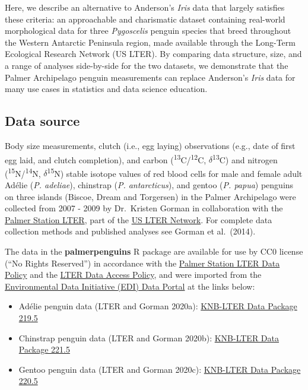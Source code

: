 Here, we describe an alternative to Anderson's \emph{Iris} data that largely satisfies these criteria: an approachable and charismatic dataset containing real-world morphological data for three \emph{Pygoscelis} penguin species that breed throughout the Western Antarctic Peninsula region, made available through the Long-Term Ecological Research Network (US LTER). By comparing data structure, size, and a range of analyses side-by-side for the two datasets, we demonstrate that the Palmer Archipelago penguin measurements can replace Anderson's \emph{Iris} data for many use cases in statistics and data science education.

\hypertarget{data-source}{%
\subsection{Data source}\label{data-source}}

Body size measurements, clutch (i.e., egg laying) observations (e.g., date of first egg laid, and clutch completion), and carbon (\textsuperscript{13}C/\textsuperscript{12}C, \(\delta\)\textsuperscript{13}C) and nitrogen (\textsuperscript{15}N/\textsuperscript{14}N, \(\delta\)\textsuperscript{15}N) stable isotope values of red blood cells for male and female adult Adélie (\emph{P. adeliae}), chinstrap (\emph{P. antarcticus}), and gentoo (\emph{P. papua}) penguins on three islands (Biscoe, Dream and Torgersen) in the Palmer Archipelago were collected from 2007 - 2009 by Dr.~Kristen Gorman in collaboration with the \href{https://pal.lternet.edu/}{Palmer Station LTER}, part of the \href{https://lternet.edu/}{US LTER Network}. For complete data collection methods and published analyses see Gorman et al.~(2014).

The data in the \textbf{palmerpenguins} R package are available for use by CC0 license (``No Rights Reserved'') in accordance with the \href{https://pal.lternet.edu/data/policies}{Palmer Station LTER Data Policy} and the \href{https://lternet.edu/data-access-policy/}{LTER Data Access Policy}, and were imported from the \href{https://environmentaldatainitiative.org/}{Environmental Data Initiative (EDI) Data Portal} at the links below:

\begin{itemize}
\tightlist
\item
  Adélie penguin data (LTER and Gorman 2020a): \href{https://portal.edirepository.org/nis/mapbrowse?packageid=knb-lter-pal.219.5}{KNB-LTER Data Package 219.5}
\item
  Chinstrap penguin data (LTER and Gorman 2020b): \href{https://portal.edirepository.org/nis/mapbrowse?packageid=knb-lter-pal.221.6}{KNB-LTER Data Package 221.5}
\item
  Gentoo penguin data (LTER and Gorman 2020c): \href{https://portal.edirepository.org/nis/mapbrowse?packageid=knb-lter-pal.220.5}{KNB-LTER Data Package 220.5}
\end{itemize}

